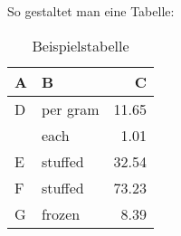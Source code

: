 \documentclass[12pt,oneside]{article}
\begin{document}
So gestaltet man eine Tabelle:
\newline
\begin{table}[H]
\caption{Beispielstabelle}
\centering
\begin{tabular}{llr}
\hline
A    & B & C \\
\hline
D      & per gram    & 11.65      \\
          & each        & 1.01       \\
E       & stuffed     & 32.54      \\
F       & stuffed     & 73.23      \\
G & frozen      & 8.39       \\
\hline
\end{tabular}
\end{table}

\clearpage
\lhead{}
\printbibliography
{}



\end{document}
